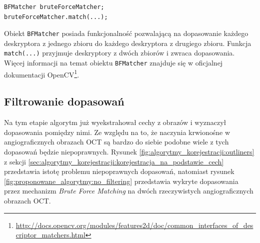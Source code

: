\begin{verbatim}
BFMatcher bruteForceMatcher;
bruteForceMatcher.match(...);
\end{verbatim}

Obiekt \texttt{BFMatcher} posiada funkcjonalność pozwalającą na dopasowanie każdego deskryptora z jednego zbioru do każdego deskryptora z drugiego zbioru. Funkcja \texttt{match(...)} przyjmuje deskryptory z dwóch zbiorów i zwraca dopasowania. Więcej informacji na temat obiektu \texttt{BFMatcher} znajduje się w oficjalnej dokumentacji OpenCV\footnote{\url{http://docs.opencv.org/modules/features2d/doc/common_interfaces_of_descriptor_matchers.html}}.

\subsection{Filtrowanie dopasowań}
\label{sec:proponowane_algorytmy:filtrowanie}

Na tym etapie algorytm już wyekstrahował cechy z obrazów i wyznaczył dopasowania pomiędzy nimi. Ze względu na to, że naczynia krwionośne w angiograficznych obrazach OCT są bardzo do siebie podobne wiele z tych dopasowań będzie niepoprawnych. Rysunek \ref{fig:algorytmy_korejestracji:outliners} z sekcji \ref{sec:algorytmy_korejestracji:korejestracja_na_podstawie_cech} przedstawia istotę problemu niepoprawnych dopasowań, natomiast rysunek \ref{fig:proponowane_algorytmy:no_filtering} przedstawia wykryte dopasowania przez mechanizm \textit{Brute Force Matching} na dwóch rzeczywistych angiograficznych obrazach OCT.


